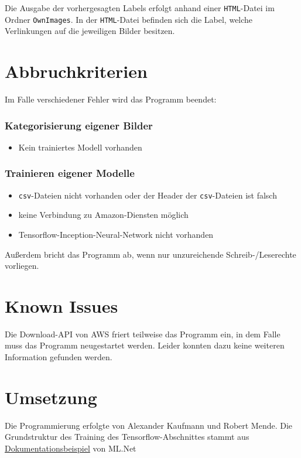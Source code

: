 \documentclass[doktyp=parbeit]{TUBAFarbeiten}
\begin{document}
Die Ausgabe der vorhergesagten Labels erfolgt anhand einer \texttt{HTML}-Datei im Ordner \texttt{OwnImages}. In der \texttt{HTML}-Datei befinden sich die Label, welche Verlinkungen auf die jeweiligen Bilder besitzen.
\section{Abbruchkriterien}
Im Falle verschiedener Fehler wird das Programm beendet:
\subsubsection*{Kategorisierung eigener Bilder}
\begin{itemize}
	\item Kein trainiertes Modell vorhanden
\end{itemize}
\subsubsection*{Trainieren eigener Modelle}	
\begin{itemize}
	\item \texttt{csv}-Dateien nicht vorhanden oder der Header der \texttt{csv}-Dateien ist falsch
	\item keine Verbindung zu Amazon-Diensten möglich
	\item Tensorflow-Inception-Neural-Network nicht vorhanden
\end{itemize}
Außerdem bricht das Programm ab, wenn nur unzureichende Schreib-/Leserechte vorliegen.  
\section{Known Issues}
Die Download-API von AWS friert teilweise das Programm ein, in dem Falle muss das Programm neugestartet werden. Leider konnten dazu keine weiteren Information gefunden werden. 
\section{Umsetzung}
Die Programmierung erfolgte von Alexander Kaufmann und Robert Mende. Die Grundstruktur des Training des Tensorflow-Abschnittes stammt aus \href{https://docs.microsoft.com/de-de/dotnet/machine-learning/tutorials/image-classification}{Dokumentationsbeispiel} von ML.Net
\end{document}
